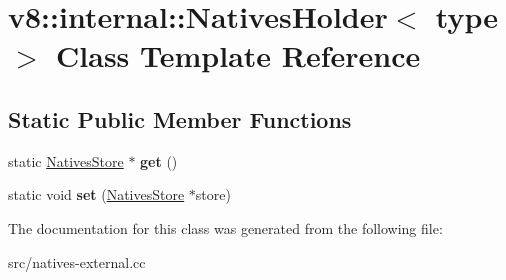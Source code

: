 \hypertarget{classv8_1_1internal_1_1_natives_holder}{}\section{v8\+:\+:internal\+:\+:Natives\+Holder$<$ type $>$ Class Template Reference}
\label{classv8_1_1internal_1_1_natives_holder}
\subsection*{Static Public Member Functions}
\begin{DoxyCompactItemize}
\item 
\hypertarget{classv8_1_1internal_1_1_natives_holder_a132e470b1bc472fd50433504c0d859e7}{}static \hyperlink{classv8_1_1internal_1_1_natives_store}{Natives\+Store} $\ast$ {\bfseries get} ()\label{classv8_1_1internal_1_1_natives_holder_a132e470b1bc472fd50433504c0d859e7}

\item 
\hypertarget{classv8_1_1internal_1_1_natives_holder_a9e1d218642005655136a936c63201797}{}static void {\bfseries set} (\hyperlink{classv8_1_1internal_1_1_natives_store}{Natives\+Store} $\ast$store)\label{classv8_1_1internal_1_1_natives_holder_a9e1d218642005655136a936c63201797}

\end{DoxyCompactItemize}


The documentation for this class was generated from the following file\+:\begin{DoxyCompactItemize}
\item 
src/natives-\/external.\+cc\end{DoxyCompactItemize}
